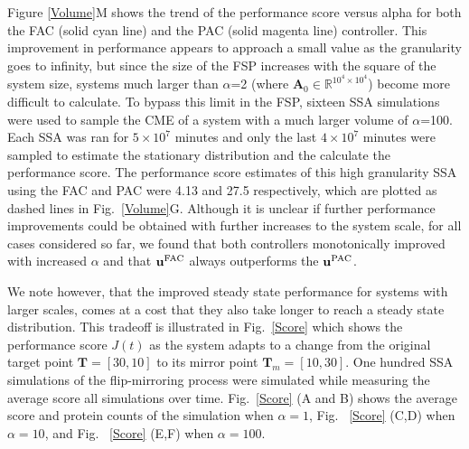 \documentclass[12pt]{article}
\begin{document}
Figure \ref{Volume}M shows the trend of the performance score versus alpha for both the FAC (solid cyan line) and the PAC (solid magenta line) controller. This improvement in performance appears to approach a small value as the granularity goes to infinity, but since the size of the FSP increases with the square of the system size, systems much larger than $\alpha$=2 (where $\mathbf{A}_0\in \mathbb{R}^{10^4\times10^4}$) become more difficult to calculate. 
To bypass this limit in the FSP, sixteen SSA simulations were used to sample the CME of a system with a much larger volume of $\alpha$=100. Each SSA was ran for $5\times10^7$ minutes and only the last $4\times10^7$ minutes were sampled to estimate the stationary distribution and the calculate the performance score. The performance score estimates of this high granularity SSA using the FAC and PAC were 4.13 and 27.5 respectively, which are plotted as dashed lines in Fig.\ \ref{Volume}G. Although it is unclear if further performance improvements could be obtained with further increases to the system scale, for all cases considered so far, we found that both controllers monotonically improved with increased $\alpha$ and that $\mathbf{u}^{\rm FAC}$ always outperforms the $\mathbf{u}^{\rm PAC}$. 




We note however, that the improved steady state performance for systems with larger scales, comes at a cost that they also take longer to reach a steady state distribution. This tradeoff is illustrated in Fig.\ \ref{Score} which shows the performance score $J(t)$ as the system adapts to a change from the original target point $\mathbf{T} = [30,10]$ to its mirror point $\mathbf{T}_m = [10,30]$.  
One hundred SSA simulations of the flip-mirroring process were simulated while measuring the average score all simulations over time. Fig.\ \ref{Score} (A and B) shows the average score and protein counts of the simulation when $\alpha=1$, Fig. \ \ref{Score} (C,D) when $\alpha = 10$, and Fig. \ \ref{Score} (E,F) when $\alpha = 100$. 
\end{document}

